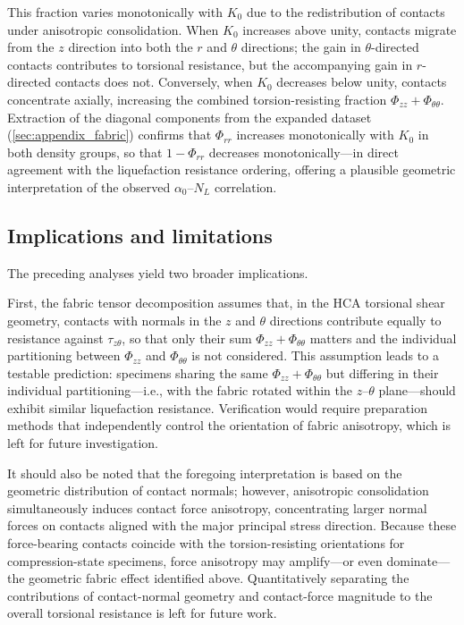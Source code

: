 \documentclass[a4paper,fleqn]{cas-sc}
\newcommand{\Kzero}{\ensuremath{K_0}}
\begin{document}
This fraction varies monotonically with \Kzero{} due to the redistribution of contacts under anisotropic consolidation. When \Kzero{} increases above unity, contacts migrate from the $z$ direction into both the $r$ and $\theta$ directions; the gain in $\theta$-directed contacts contributes to torsional resistance, but the accompanying gain in $r$-directed contacts does not. Conversely, when \Kzero{} decreases below unity, contacts concentrate axially, increasing the combined torsion-resisting fraction $\Phi_{zz} + \Phi_{\theta\theta}$. Extraction of the diagonal components from the expanded dataset (\cref{sec:appendix_fabric}) confirms that $\Phi_{rr}$ increases monotonically with \Kzero{} in both density groups, so that $1 - \Phi_{rr}$ decreases monotonically---in direct agreement with the liquefaction resistance ordering, offering a plausible geometric interpretation of the observed $\alpha_0$--$N_L$ correlation.

\subsection{Implications and limitations}
\label{subsec:limitations}

The preceding analyses yield two broader implications.

First, the fabric tensor decomposition assumes that, in the HCA torsional shear geometry, contacts with normals in the $z$ and $\theta$ directions contribute equally to resistance against $\tau_{z\theta}$, so that only their sum $\Phi_{zz} + \Phi_{\theta\theta}$ matters and the individual partitioning between $\Phi_{zz}$ and $\Phi_{\theta\theta}$ is not considered. This assumption leads to a testable prediction: specimens sharing the same $\Phi_{zz} + \Phi_{\theta\theta}$ but differing in their individual partitioning---i.e., with the fabric rotated within the $z$--$\theta$ plane---should exhibit similar liquefaction resistance. Verification would require preparation methods that independently control the orientation of fabric anisotropy, which is left for future investigation.

It should also be noted that the foregoing interpretation is based on the geometric distribution of contact normals; however, anisotropic consolidation simultaneously induces contact force anisotropy, concentrating larger normal forces on contacts aligned with the major principal stress direction. Because these force-bearing contacts coincide with the torsion-resisting orientations for compression-state specimens, force anisotropy may amplify---or even dominate---the geometric fabric effect identified above. Quantitatively separating the contributions of contact-normal geometry and contact-force magnitude to the overall torsional resistance is left for future work.
\end{document}
